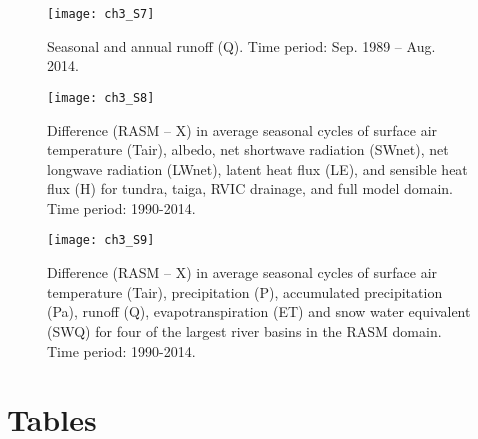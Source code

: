 \begin{figure}
    \centering
    \texttt{[image: ch3\_S7]}
    \caption{Seasonal and annual runoff (Q).
    Time period: Sep. 1989 – Aug. 2014.}
\end{figure}

\begin{figure}
    \centering
    \texttt{[image: ch3\_S8]}
    \caption{Difference (RASM – X) in average seasonal cycles of surface air temperature (Tair), albedo, net shortwave radiation (SWnet), net longwave radiation (LWnet), latent heat flux (LE), and sensible heat flux (H) for tundra, taiga, RVIC drainage, and full model domain.
    Time period: 1990-2014.}
\end{figure}

\begin{figure}
    \centering
    \texttt{[image: ch3\_S9]}
    \caption{Difference (RASM – X) in average seasonal cycles of surface air temperature (Tair), precipitation (P), accumulated precipitation (Pa), runoff (Q), evapotranspiration (ET) and snow water equivalent (SWQ) for four of the largest river basins in the RASM domain.
    Time period: 1990-2014.}
\end{figure}

\clearpage
\section{Tables}

